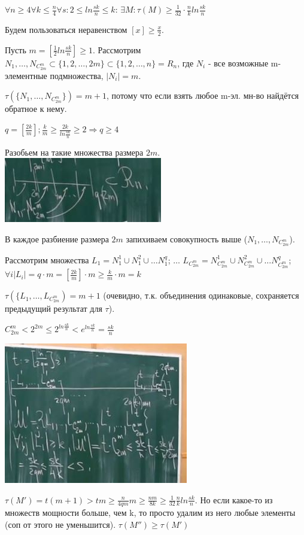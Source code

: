 \Th $\forall n \geqslant 4 \forall k \leqslant \frac{n}{4} \forall s : 2 \leqslant ln \frac{sk}{n} \leqslant k$: $\exists M: \tau (M) \geqslant \frac{1}{32} \cdot  \frac{n}{k} ln \frac{sk}{n}$

Будем пользоваться неравенством $[x] \geqslant \frac{x}{2}$.

\Proof Пусть $m = [\frac{1}{2} ln \frac{sk}{n}] \geqslant 1$. Рассмотрим $N_1, \dots, N_{C_{2m}^m} \subset \{ 1, 2, \dots, 2m\} \subset \{1, 2, \dots, n\} = R_n$, где $N_i$ - все возможные m-элементные подмножества, $|N_i| = m$. 

$\tau (\{N_1, \dots, N_{C_{2m}^m}\}) = m + 1$, потому что если взять любое m-эл. мн-во найдётся обратное к нему. 

$q = [\frac{2k}{m}]; \frac{k}{m} \geqslant \frac{2k}{ln \frac{sk}{n}} \geqslant 2 \Rightarrow q \geqslant 4$

Разобьем на такие множества размера $2m$.
\includegraphics[]{images/est2.JPG}

В каждое разбиение размера $2m$ запихиваем совокупность выше ($N_1, \dots, N_{C_{2m}^{m}}$).

Рассмотрим множества $L_1 = N_1^1 \cup N_1^2 \cup \dots N_1^q$; $\dots$ $L_{C_{2m}^{m}} = N_{C_{2m}^{m}}^1 \cup N_{C_{2m}^{m}}^2 \cup \dots N_{C_{2m}^{m}}^q$; $ \forall i |L_i| = q\cdot m = [\frac{2k}{m}] \cdot m \geqslant \frac{k}{m} \cdot m = k$

$\tau (\{L_1, \dots, L_{C_{2m}^{m}}) = m + 1$ (очевидно, т.к. объединения одинаковые, сохраняется предыдущий результат для $\tau$).

$C_{2m}^m < 2^{2m} \leqslant 2^{ln \frac{sk}{n}} < e^{ln \frac{sk}{n}} = \frac{sk}{n}$

\includegraphics[]{images/est3.JPG}

$\tau(M') = t(m+1) > tm \geqslant \frac{n}{4qm} m \geqslant \frac{nm}{8k} \geqslant \frac{1}{32} \frac{n}{k} ln \frac{sk}{n}$. Но если какое-то из множеств мощности больше, чем k, то просто удалим из него любые элементы (соп от этого не уменьшится). $\tau(M'') \geqslant \tau(M')$
\EndProof